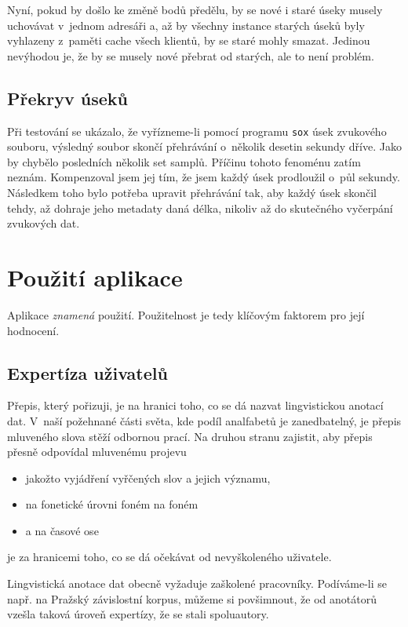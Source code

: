 Nyní, pokud by došlo ke změně bodů předělu, by se nové i staré úseky musely
uchovávat v~jednom adresáři a, až by všechny instance starých úseků byly
vyhlazeny z~paměti cache všech klientů, by se staré mohly smazat. Jedinou
nevýhodou je, že by se musely nové přebrat od starých, ale to není problém.

\subsection{Překryv úseků}

Při testování se ukázalo, že vyřízneme-li pomocí programu \texttt{sox} úsek
zvukového souboru, výsledný soubor skončí přehrávání o~několik desetin sekundy
dříve. Jako by chybělo posledních několik set samplů. Příčinu tohoto fenoménu
zatím neznám. Kompenzoval jsem jej tím, že jsem každý úsek prodloužil o~půl
sekundy. Následkem toho bylo potřeba upravit přehrávání tak, aby každý úsek
skončil tehdy, až dohraje jeho metadaty daná délka, nikoliv až do skutečného
vyčerpání zvukových dat.


\section{Použití aplikace}

Aplikace {\em znamená} použití. Použitelnost je tedy klíčovým faktorem pro její hodnocení.

\subsection{Expertíza uživatelů}

Přepis, který pořizuji, je na hranici toho, co se dá nazvat lingvistickou
anotací dat. V~naší požehnané části světa, kde podíl analfabetů je zanedbatelný,
je přepis mluveného slova stěží odbornou prací. Na druhou stranu zajistit, aby
přepis přesně odpovídal mluvenému projevu
\begin{itemize}
\item{jakožto vyjádření vyřčených slov a jejich významu,}
\item{na fonetické úrovni foném na foném}
\item{a na časové ose}
\end{itemize}
je za hranicemi toho, co se dá očekávat od nevyškoleného uživatele.

Lingvistická anotace dat obecně vyžaduje zaškolené pracovníky. Podíváme-li se
např. na Pražský závislostní korpus, můžeme si povšimnout, že od anotátorů
vzešla taková úroveň expertízy, že se stali spoluautory\cite{hajivc2005complex}.

